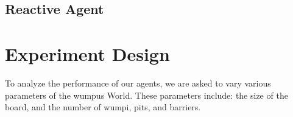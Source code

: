 \documentclass{article}
\begin{document}
		\subsection{Reactive Agent}
			
		
		
	\section{Experiment Design}
	
	To analyze the performance of our agents, we are asked to vary various parameters of the wumpus World. These parameters include: the size of the board, and the number of wumpi, pits, and barriers. 
	
	
	

	




		
	
\end{document}
